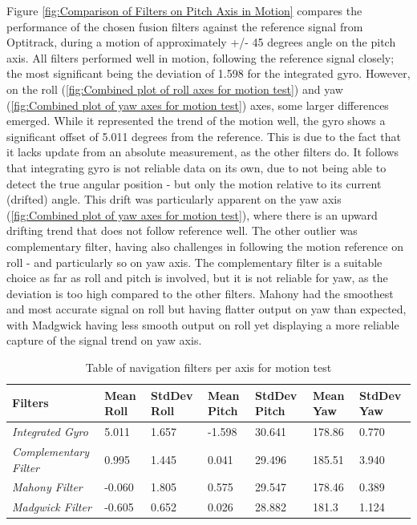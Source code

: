 Figure \ref{fig:Comparison of Filters on Pitch Axis in Motion} compares the performance of the chosen fusion filters against the reference signal from Optitrack, during a motion of approximately +/- 45 degrees angle on the pitch axis. All filters performed well in motion, following the reference signal closely; the most significant being the deviation of 1.598 for the integrated gyro. However, on the roll (\ref{fig:Combined plot of roll axes for motion test}) and yaw (\ref{fig:Combined plot of yaw axes for motion test}) axes, some larger differences emerged. While it represented the trend of the motion well, the gyro shows a significant offset of 5.011 degrees from the reference. This is due to the fact that it lacks update from an absolute measurement, as the other filters do. It follows that integrating gyro is not reliable data on its own, due to not being able to detect the true angular position - but only the motion relative to its current (drifted) angle. This drift was particularly apparent on the yaw axis (\ref{fig:Combined plot of yaw axes for motion test}), where there is an upward drifting trend that does not follow reference well. The other outlier was complementary filter, having also challenges in following the motion reference on roll - and particularly so on yaw axis. The complementary filter is a suitable choice as far as roll and pitch is involved, but it is not reliable for yaw, as the deviation is too high compared to the other filters. Mahony had the smoothest and most accurate signal on roll but having flatter output on yaw than expected, with Madgwick having less smooth output on roll yet displaying a more reliable capture of the signal trend on yaw axis. 


\begin{table}[H]
\centering
\begin{tabular}{ | m{7em} | m{1.5cm}|m{1.5cm}|m{1.5cm}|m{1.5cm}|m{1.5cm}|m{1.5cm}| } 
\hline
\textbf{Filters} & \textbf{Mean Rol}l & \textbf{StdDev Roll}& \textbf{Mean Pitch} & \textbf{StdDev Pitch} & \textbf{Mean Yaw} &  \textbf{StdDev Yaw} \\
\hline
\textit{Integrated Gyro} & 5.011 & 1.657 & -1.598 & 30.641 &  178.86 & 0.770 \\
\hline
\textit{Complementary Filter}  & 0.995 & 1.445 & 0.041 & 29.496 &185.51 &  3.940 \\ 
\hline
\textit{Mahony Filter} & -0.060&1.805 & 0.575 & 29.547 &178.46 & 0.389 \\ 
\hline
\textit{Madgwick Filter}  &  -0.605 &0.652 & 0.026 & 28.882 & 181.3  &  1.124 \\
\hline
\end{tabular}
\caption{Table of navigation filters per axis for motion test}
\label{table:2}
\end{table}

